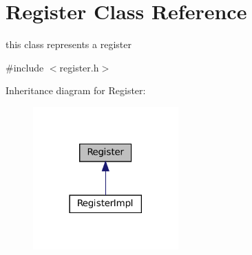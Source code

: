 \hypertarget{classRegister}{}\section{Register Class Reference}
\label{classRegister}


this class represents a register  




{\ttfamily \#include $<$register.\+h$>$}



Inheritance diagram for Register\+:\nopagebreak
\begin{figure}[H]
\begin{center}
\leavevmode
\includegraphics[width=158pt]{classRegister__inherit__graph}
\end{center}
\end{figure}
